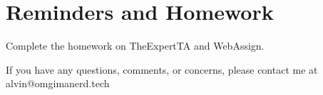 \documentclass[letterpaper, 12pt]{math}
\begin{document}
\section*{Reminders and Homework}
Complete the homework on TheExpertTA and WebAssign.

\begin{center}
  If you have any questions, comments, or concerns, please contact me at
  alvin@omgimanerd.tech
\end{center}
\end{document}
